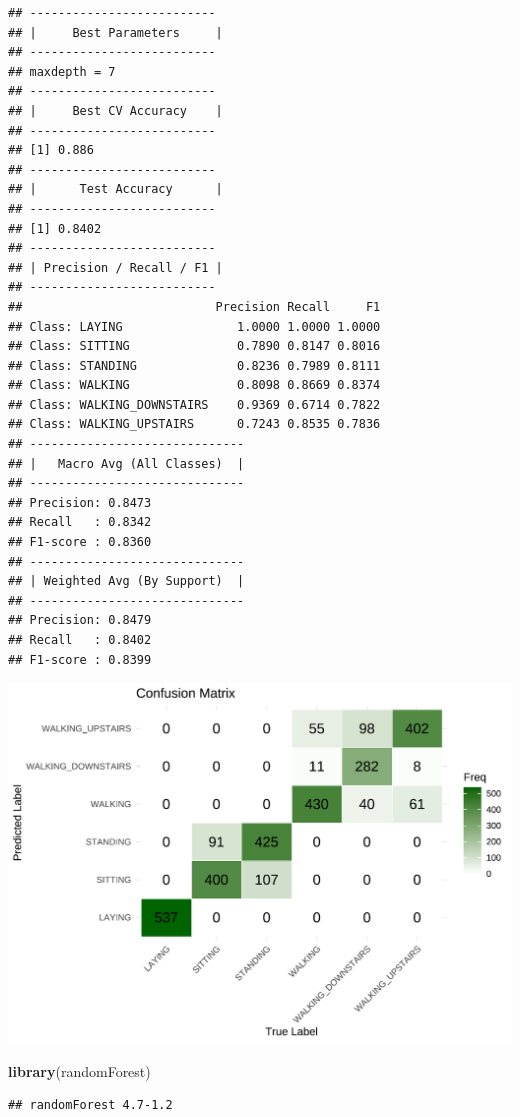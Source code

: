 \documentclass[
]{article}
\newenvironment{Shaded}{\begin{snugshade}}{\end{snugshade}}
\newcommand{\FunctionTok}[1]{\textcolor[rgb]{0.13,0.29,0.53}{\textbf{#1}}}
\newcommand{\NormalTok}[1]{#1}
\begin{document}
\begin{verbatim}
## --------------------------
## |     Best Parameters     |
## --------------------------
## maxdepth = 7
## --------------------------
## |     Best CV Accuracy    |
## --------------------------
## [1] 0.886
## --------------------------
## |      Test Accuracy      |
## --------------------------
## [1] 0.8402
## --------------------------
## | Precision / Recall / F1 |
## --------------------------
##                           Precision Recall     F1
## Class: LAYING                1.0000 1.0000 1.0000
## Class: SITTING               0.7890 0.8147 0.8016
## Class: STANDING              0.8236 0.7989 0.8111
## Class: WALKING               0.8098 0.8669 0.8374
## Class: WALKING_DOWNSTAIRS    0.9369 0.6714 0.7822
## Class: WALKING_UPSTAIRS      0.7243 0.8535 0.7836
## ------------------------------
## |   Macro Avg (All Classes)  |
## ------------------------------
## Precision: 0.8473
## Recall   : 0.8342
## F1-score : 0.8360
## ------------------------------
## | Weighted Avg (By Support)  |
## ------------------------------
## Precision: 0.8479
## Recall   : 0.8402
## F1-score : 0.8399
\end{verbatim}

\includegraphics{report_files/figure-latex/unnamed-chunk-27-1.pdf}

\begin{Shaded}
\begin{Highlighting}[]
\FunctionTok{library}\NormalTok{(randomForest)}
\end{Highlighting}
\end{Shaded}

\begin{verbatim}
## randomForest 4.7-1.2
\end{verbatim}
\end{document}
